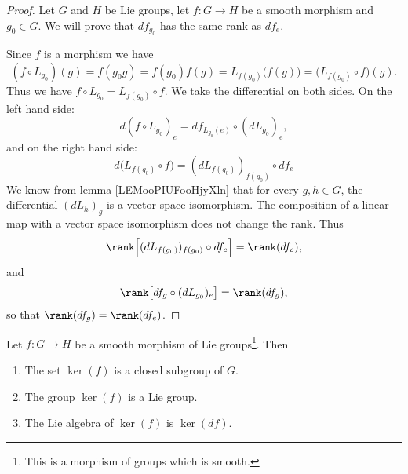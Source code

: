 \begin{proof}
	Let \( G\) and \( H\) be Lie groups, let \( f\colon G\to H\) be a smooth morphism and \( g_0\in G\). We will prove that \( df_{g_0}\) has the same rank as \( df_e\).

	Since \( f\) is a morphism we have
	\begin{equation}
		(f\circ L_{g_0})(g)=f(g_0g)=f(g_0)f(g)=L_{f(g_0)}\big( f(g) \big)=\big( L_{f(g_0)}\circ f \big)(g).
	\end{equation}
	Thus we have \( f\circ L_{g_0}=L_{f(g_0)}\circ f\). We take the differential on both sides. On the left hand side:
	\begin{equation}
		d(f\circ L_{g_0})_e=df_{L_{g_0}(e)}\circ(dL_{g_0})_e,
	\end{equation}
	and on the right hand side:
	\begin{equation}
		d\big( L_{f(g_0)}\circ f \big)=(dL_{f(g_0)})_{f(g_0)}\circ df_e
	\end{equation}
	We know from lemma \ref{LEMooPIUFooHjyXln} that for every \( g,h\in G\), the differential \( (dL_h)_g\) is a vector space isomorphism. The composition of a linear map with a vector space isomorphism does not change the rank. Thus
	\begin{equation}
		\rank\Big[ (dL_{f(g_0)})_{f(g_0)}\circ df_e \Big]=\rank(df_e),
	\end{equation}
	and
	\begin{equation}
		\rank\big[ df_g\circ(dL_{g_0})_e \big]=\rank(df_g),
	\end{equation}
	so that \( \rank(df_g)=\rank(df_e)\).
\end{proof}

\begin{proposition}
	Let \( f\colon G\to H\) be a smooth morphism of Lie groups\footnote{This is a morphism of groups which is smooth.}. Then
	\begin{enumerate}
		\item
		      The set \( \ker(f)\) is a closed subgroup of \( G\).
		\item
		      The group \( \ker(f)\) is a Lie group.
		\item
		      The Lie algebra of \( \ker(f)\) is \( \ker(df)\).
	\end{enumerate}
\end{proposition}

